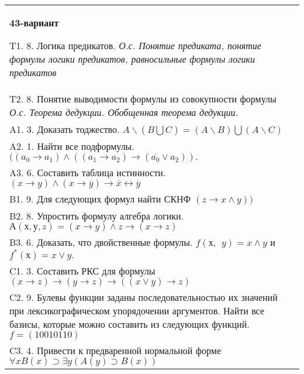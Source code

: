 \documentclass{article}
\begin{document}
\begin{tabular}{m{17cm}}
\textbf{43-вариант}
\newline

T1. 8. Логика предикатов. \emph{О.с. Понятие предиката, понятие формулы логики предикатов, равносильные формулы логики предикатов} \\
T2. 8. Понятие выводимости формулы из совокупности формулы \emph{О.с. Теорема дедукции. Обобщенная теорема дедукции.} \\
A1. 3. Доказать тоджество. \(A\backslash(B\bigcup C) = (A\backslash B)\bigcup(A\backslash C)\) \\
A2. 1. Найти все подформулы. \(((a_{0} \rightarrow a_{1}) \land ((a_{1} \rightarrow a_{2}) \rightarrow (\overline{a_{0}} \vee a_{2})).\) \\
A3. 6. Составить таблица истинности. \((x \rightarrow y) \land (x \rightarrow \overline{y}) \rightarrow \overline{x} \leftrightarrow \overline{y}\) \\
B1. 9. Для следующих формул найти СКНФ \((z \rightarrow x \land y))\) \\
B2. 8. Упростить формулу алгебра логики. \(А(х,у,z) = (x \rightarrow y) \land z \rightarrow (x \rightarrow z)\) \\
B3. 6. Доказать, что двойственные формулы. \(f(х,\ \ y) = x \land y\) и \(f^{*}(х) = x \vee y.\) \\
C1. 3. Составить РКС для формулы \((x \rightarrow z) \rightarrow (y \rightarrow z) \rightarrow ((x \vee y) \rightarrow z)\) \\
C2. 9. Булевы функции заданы последовательностью их значений при лексикографическом упорядочении аргументов. Найти все базисы, которые можно составить из следующих функций. \(f = (10010110)\) \\
C3. 4. Привести к предваренной нормальной форме \(\forall xB(x) \supset \exists y(A(y) \supset B(x))\) \\

\end{tabular}
\vspace{1cm}
\end{document}
